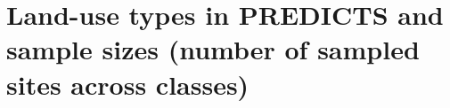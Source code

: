 \clearpage

\section{Land-use types in PREDICTS and sample sizes (number of sampled sites across classes)}

